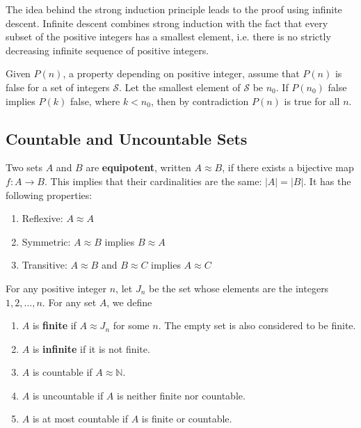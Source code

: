 \documentclass{article}
\begin{document}
    The idea behind the strong induction principle leads to the proof using infinite descent. Infinite descent combines strong induction with the fact that every subset of the positive integers has a smallest element, i.e. there is no strictly decreasing infinite sequence of positive integers. 

    \begin{lemma}
    Given $P(n)$, a property depending on positive integer, assume that $P(n)$ is false for a set of integers $\mathcal{S}$. Let the smallest element of $\mathcal{S}$ be $n_0$. If $P(n_0)$ false implies $P(k)$ false, where $k < n_0$, then by contradiction $P(n)$ is true for all $n$. 
    \end{lemma}

    \subsection{Countable and Uncountable Sets}

    \begin{definition}[Equipotence]
    Two sets $A$ and $B$ are \textbf{equipotent}, written $A \approx B$, if there exists a bijective map $f: A \rightarrow B$. This implies that their cardinalities are the same: $|A| = |B|$. It has the following properties: 
    \begin{enumerate}
        \item Reflexive: $A \approx A$
        \item Symmetric: $A \approx B$ implies $B \approx A$
        \item Transitive: $A \approx B$ and $B \approx C$ implies $A \approx C$
    \end{enumerate}
    \end{definition}

    \begin{definition}
    For any positive integer $n$, let $J_n$ be the set whose elements are the integers $1, 2, \ldots, n$. For any set $A$, we define 
    \begin{enumerate}
        \item $A$ is \textbf{finite} if $A \approx J_n$ for some $n$. The empty set is also considered to be finite. 
        \item $A$ is \textbf{infinite} if it is not finite. 
        \item $A$ is countable if $A \approx \mathbb{N}$. 
        \item $A$ is uncountable if $A$ is neither finite nor countable. 
        \item $A$ is at most countable if $A$ is finite or countable. 
    \end{enumerate}
    \end{definition}
\end{document}
